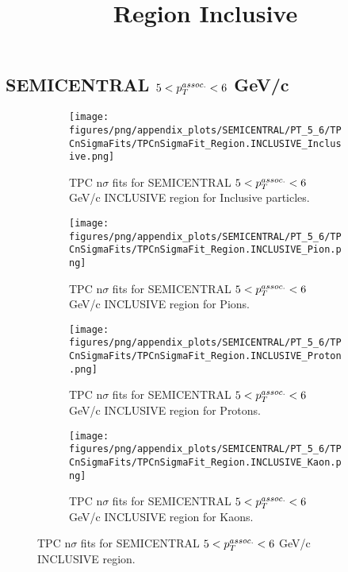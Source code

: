     
            \subsection{SEMICENTRAL $5 < \pTassoc < 6$ GeV/c}
            \begin{figure}[H]
                \title{Region Inclusive}
                \begin{subfigure}[b]{0.5\textwidth}
                    \centering
                    \texttt{[image: figures/png/appendix\_plots/SEMICENTRAL/PT\_5\_6/TPCnSigmaFits/TPCnSigmaFit\_Region.INCLUSIVE\_Inclusive.png]}
                    \caption{TPC n$\sigma$ fits for SEMICENTRAL $5 < \pTassoc < 6$ GeV/c INCLUSIVE region for Inclusive particles.}
                    \label{fig:appendix_SEMICENTRAL_$5 < \pTassoc < 6$ GeV/c_INCLUSIVE_Inclusive}
                \end{subfigure}
                \begin{subfigure}[b]{0.5\textwidth}
                    \centering
                    \texttt{[image: figures/png/appendix\_plots/SEMICENTRAL/PT\_5\_6/TPCnSigmaFits/TPCnSigmaFit\_Region.INCLUSIVE\_Pion.png]}
                    \caption{TPC n$\sigma$ fits for SEMICENTRAL $5 < \pTassoc < 6$ GeV/c INCLUSIVE region for Pions.}
                    \label{fig:appendix_SEMICENTRAL_$5 < \pTassoc < 6$ GeV/c_INCLUSIVE_Pion}
                \end{subfigure}
                \begin{subfigure}[b]{0.5\textwidth}
                    \centering
                    \texttt{[image: figures/png/appendix\_plots/SEMICENTRAL/PT\_5\_6/TPCnSigmaFits/TPCnSigmaFit\_Region.INCLUSIVE\_Proton.png]}
                    \caption{TPC n$\sigma$ fits for SEMICENTRAL $5 < \pTassoc < 6$ GeV/c INCLUSIVE region for Protons.}
                    \label{fig:appendix_SEMICENTRAL_$5 < \pTassoc < 6$ GeV/c_INCLUSIVE_Proton}
                \end{subfigure}
                \begin{subfigure}[b]{0.5\textwidth}
                    \centering
                    \texttt{[image: figures/png/appendix\_plots/SEMICENTRAL/PT\_5\_6/TPCnSigmaFits/TPCnSigmaFit\_Region.INCLUSIVE\_Kaon.png]}
                    \caption{TPC n$\sigma$ fits for SEMICENTRAL $5 < \pTassoc < 6$ GeV/c INCLUSIVE region for Kaons.}
                    \label{fig:appendix_SEMICENTRAL_$5 < \pTassoc < 6$ GeV/c_INCLUSIVE_Kaon}
                \end{subfigure}
                \caption{TPC n$\sigma$ fits for SEMICENTRAL $5 < \pTassoc < 6$ GeV/c INCLUSIVE region.}
                \label{fig:appendix_SEMICENTRAL_$5 < \pTassoc < 6$ GeV/c_INCLUSIVE}
            \end{figure}
